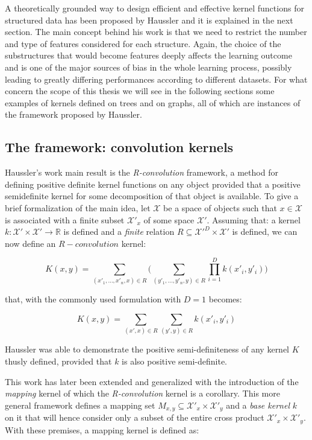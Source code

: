 A theoretically grounded way to design efficient and effective kernel functions for
structured data has been proposed by Haussler \cite{haussler99convolution} and
it is explained in the next section.
The main concept behind his work is that we need to restrict the number and type
of features considered for each structure.
Again, the choice of the substructures that would become features deeply affects
the learning outcome and is one of the major sources of bias in the whole learning
process, possibly leading to greatly differing performances according to different
datasets.
For what concern the scope of this thesis we will see in the following sections
some examples of kernels defined on trees and on graphs, all of which are instances
of the framework proposed by Haussler.

\subsection{The framework: convolution kernels}
\label{subsec:convolution}
Haussler's work \cite{haussler99convolution} main result is the \emph{R-convolution} framework,
a method for defining positive definite kernel functions on any object provided that a
positive semidefinite kernel for some decomposition of that object is available.
To give a brief formalization of the main idea, let $\mathcal{X}$ be a space of 
objects such that $x \in \mathcal{X}$ is associated with a finite subset
$\mathcal{X'_\mathit{x}}$ of some space $\mathcal{X'}$.
Assuming that: a kernel $k: \mathcal{X'}\times \mathcal{X'} \to \mathbb{R}$ is
defined and a \emph{finite} relation $R \subseteq \mathcal{X'}^D \times \mathcal{X'}$
is defined, we can now define an $R-convolution$ kernel:

\begin{equation}
    K(x,y) = \sum_{(x'_1,\dots,x'_n,x) \in R} \Bigg(\sum_{(y'_1,\dots,y'_n,y) \in R}
    \prod_{i=1}^D k(x'_i,y'_i)\Bigg)
\end{equation}

that, with the commonly used formulation with $D=1$ becomes:

\begin{equation}
    K(x,y) = \sum_{(x',x) \in R} \sum_{(y',y) \in R} k(x'_i,y'_i)
\end{equation}

Haussler was able to demonstrate the positive semi-definiteness of any kernel $K$
thusly defined, provided that $k$ is also positive semi-definite.

This work has later been extended and generalized \cite{Shin2010} with the introduction
of the \emph{mapping} kernel of which the \emph{R-convolution} kernel is a corollary.
This more general framework defines a mapping set
$M_{x,y} \subseteq \mathcal{X'_\mathit{x}} \times \mathcal{X'_\mathit{y}}$ and a \emph{base kernel} $k$ on it
that will hence consider only a subset of the entire cross product $\mathcal{X'_\mathit{x}} \times \mathcal{X'_\mathit{y}}$.
With these premises, a mapping kernel is defined as:
    
